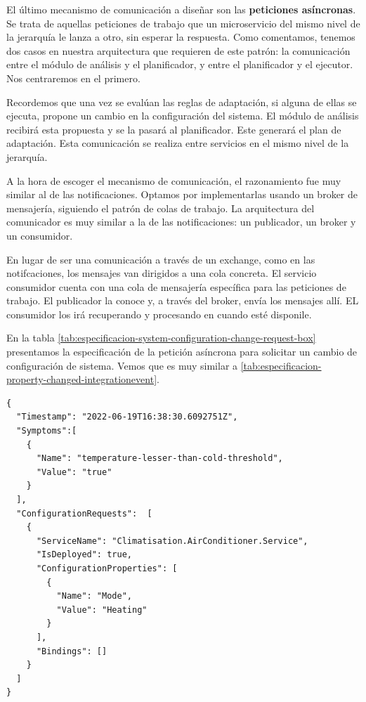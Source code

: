 El último mecanismo de comunicación a diseñar son las \textbf{peticiones asíncronas}. Se trata de aquellas peticiones de trabajo que un microservicio del mismo nivel de la jerarquía le lanza a otro, sin esperar la respuesta. Como comentamos, tenemos dos casos en nuestra arquitectura que requieren de este patrón: la comunicación entre el módulo de análisis y el planificador, y entre el planificador y el ejecutor. Nos centraremos en el primero.

Recordemos que una vez se evalúan las reglas de adaptación, si alguna de ellas se ejecuta, propone un cambio en la configuración del sistema. El módulo de análisis recibirá esta propuesta y se la pasará al planificador. Este generará el plan de adaptación. Esta comunicación se realiza entre servicios en el mismo nivel de la jerarquía.

A la hora de escoger el mecanismo de comunicación, el razonamiento fue muy similar al de las notificaciones. Optamos por implementarlas usando un broker de mensajería, siguiendo el patrón de colas de trabajo. La arquitectura del comunicador es muy similar a la de las notificaciones: un publicador, un broker y un consumidor.

En lugar de ser una comunicación  a través de un exchange, como en las notifcaciones, los mensajes van dirigidos a una cola concreta. El servicio consumidor cuenta con una cola de mensajería específica para las peticiones de trabajo. El publicador la conoce y, a través del broker, envía los mensajes allí. EL consumidor los irá recuperando y procesando en cuando esté disponile.

En la tabla \ref{tab:especificacion-system-configuration-change-request-box} presentamos la especificación de la petición asíncrona para solicitar un cambio de configuración de sistema. Vemos que es muy similar a \ref{tab:especificacion-property-changed-integrationevent}.

\newsavebox\systemconfigurationchangerequestbox
\begin{lrbox}{\systemconfigurationchangerequestbox}
  \begin{minipage}[t]{2in}
    \begin{verbatim}
{
  "Timestamp": "2022-06-19T16:38:30.6092751Z",
  "Symptoms":[
    {
      "Name": "temperature-lesser-than-cold-threshold",
      "Value": "true"
    }
  ],
  "ConfigurationRequests":  [
    {
      "ServiceName": "Climatisation.AirConditioner.Service",
      "IsDeployed": true,
      "ConfigurationProperties": [
        {
          "Name": "Mode",
          "Value": "Heating"
        }
      ],
      "Bindings": []
    }
  ]
}
        \end{verbatim}
  \end{minipage}
\end{lrbox}

